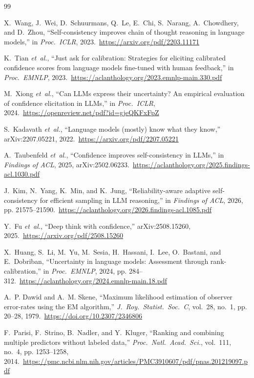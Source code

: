 \documentclass[conference]{IEEEtran}
\begin{document}
\begin{thebibliography}{99}

X.~Wang, J.~Wei, D.~Schuurmans, Q.~Le, E.~Chi, S.~Narang, A.~Chowdhery, and D.~Zhou, ``Self-consistency improves chain of thought reasoning in language models,'' in \emph{Proc.\ ICLR}, 2023.\ \url{https://arxiv.org/pdf/2203.11171}

K.~Tian \emph{et~al.}, ``Just ask for calibration: Strategies for eliciting calibrated confidence scores from language models fine-tuned with human feedback,'' in \emph{Proc.\ EMNLP}, 2023.\ \url{https://aclanthology.org/2023.emnlp-main.330.pdf}

M.~Xiong \emph{et~al.}, ``Can LLMs express their uncertainty? An empirical evaluation of confidence elicitation in LLMs,'' in \emph{Proc.\ ICLR}, 2024.\ \url{https://openreview.net/pdf?id=gjeQKFxFpZ}

S.~Kadavath \emph{et~al.}, ``Language models (mostly) know what they know,'' arXiv:2207.05221, 2022.\ \url{https://arxiv.org/pdf/2207.05221}

A.~Taubenfeld \emph{et~al.}, ``Confidence improves self-consistency in LLMs,'' in \emph{Findings of ACL}, 2025, arXiv:2502.06233.\ \url{https://aclanthology.org/2025.findings-acl.1030.pdf}

J.~Kim, N.~Yang, K.~Min, and K.~Jung, ``Reliability-aware adaptive self-consistency for efficient sampling in LLM reasoning,'' in \emph{Findings of ACL}, 2026, pp. 21575--21590.\ \url{https://aclanthology.org/2026.findings-acl.1085.pdf}

Y.~Fu \emph{et~al.}, ``Deep think with confidence,'' arXiv:2508.15260, 2025.\ \url{https://arxiv.org/pdf/2508.15260}

X.~Huang, S.~Li, M.~Yu, M.~Sesia, H.~Hassani, I.~Lee, O.~Bastani, and E.~Dobriban, ``Uncertainty in language models: Assessment through rank-calibration,'' in \emph{Proc.\ EMNLP}, 2024, pp. 284--312.\ \url{https://aclanthology.org/2024.emnlp-main.18.pdf}

A.~P. Dawid and A.~M. Skene, ``Maximum likelihood estimation of observer error-rates using the EM algorithm,'' \emph{J.\ Roy.\ Statist.\ Soc.\ C}, vol.~28, no.~1, pp. 20--28, 1979.\ \url{https://doi.org/10.2307/2346806}

F.~Parisi, F.~Strino, B.~Nadler, and Y.~Kluger, ``Ranking and combining multiple predictors without labeled data,'' \emph{Proc.\ Natl.\ Acad.\ Sci.}, vol.~111, no.~4, pp. 1253--1258, 2014.\ \url{https://pmc.ncbi.nlm.nih.gov/articles/PMC3910607/pdf/pnas.201219097.pdf}


\end{thebibliography}
\end{document}
